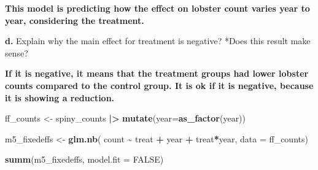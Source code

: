 \documentclass[
]{article}
\newenvironment{Shaded}{\begin{snugshade}}{\end{snugshade}}
\newcommand{\AttributeTok}[1]{\textcolor[rgb]{0.13,0.29,0.53}{#1}}
\newcommand{\ConstantTok}[1]{\textcolor[rgb]{0.56,0.35,0.01}{#1}}
\newcommand{\FunctionTok}[1]{\textcolor[rgb]{0.13,0.29,0.53}{\textbf{#1}}}
\newcommand{\NormalTok}[1]{#1}
\newcommand{\OtherTok}[1]{\textcolor[rgb]{0.56,0.35,0.01}{#1}}
\newcommand{\SpecialCharTok}[1]{\textcolor[rgb]{0.81,0.36,0.00}{\textbf{#1}}}
\begin{document}
\textbf{This model is predicting how the effect on lobster count varies
year to year, considering the treatment.}

\textbf{d.} Explain why the main effect for treatment is negative? *Does
this result make sense?

\textbf{If it is negative, it means that the treatment groups had lower
lobster counts compared to the control group. It is ok if it is
negative, because it is showing a reduction.}

\begin{Shaded}
\begin{Highlighting}[]
\NormalTok{ff\_counts }\OtherTok{\textless{}{-}}\NormalTok{ spiny\_counts }\SpecialCharTok{|\textgreater{}}
    \FunctionTok{mutate}\NormalTok{(}\AttributeTok{year=}\FunctionTok{as\_factor}\NormalTok{(year))}
    
\NormalTok{m5\_fixedeffs }\OtherTok{\textless{}{-}} \FunctionTok{glm.nb}\NormalTok{(}
\NormalTok{    count }\SpecialCharTok{\textasciitilde{}} 
\NormalTok{        treat }\SpecialCharTok{+} 
\NormalTok{        year }\SpecialCharTok{+}
\NormalTok{        treat}\SpecialCharTok{*}\NormalTok{year,}
    \AttributeTok{data =}\NormalTok{ ff\_counts)}

\FunctionTok{summ}\NormalTok{(m5\_fixedeffs, }\AttributeTok{model.fit =} \ConstantTok{FALSE}\NormalTok{)}
\end{Highlighting}
\end{Shaded}
\end{document}
